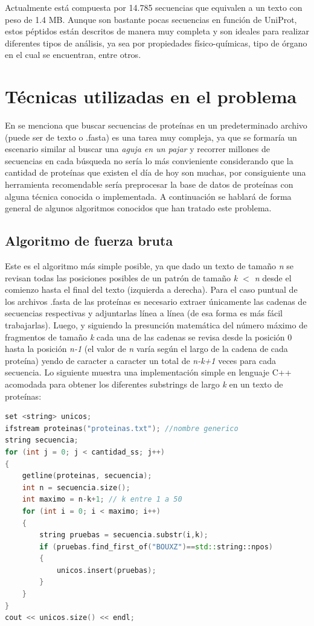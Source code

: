 Actualmente está compuesta por 14.785 secuencias que equivalen a un texto con peso de 1.4 MB. Aunque son bastante pocas secuencias en función de UniProt, estos péptidos están descritos de manera muy completa y son ideales para realizar diferentes tipos de análisis, ya sea por propiedades físico-químicas, tipo de órgano en el cual se encuentran, entre otros.

\section{Técnicas utilizadas en el problema}

En \cite{searching} se menciona que buscar secuencias de proteínas en un predeterminado archivo (puede ser de texto o .fasta) es una tarea muy compleja, ya que se formaría un escenario similar al buscar una {\textit{aguja en un pajar}} y recorrer millones de secuencias en cada búsqueda no sería lo más convieniente considerando que la cantidad de proteínas que existen el día de hoy son muchas, por consiguiente una herramienta recomendable sería preprocesar la base de datos de proteínas con alguna técnica conocida o implementada. A continuación se hablará de forma general de algunos algoritmos conocidos que han tratado este problema.

\subsection{Algoritmo de fuerza bruta}

Este es el algoritmo más simple posible\cite{fuerzabruta}, ya que dado un texto de tamaño \textit{n} se revisan todas las posiciones posibles de un patrón de tamaño \textit{k $<$ n} desde el comienzo hasta el final del texto (izquierda a derecha). Para el caso puntual de los archivos .fasta de las proteínas es necesario extraer únicamente las cadenas de secuencias respectivas y adjuntarlas línea a línea (de esa forma es más fácil trabajarlas). Luego, y siguiendo la presunción matemática del número máximo de fragmentos de tamaño \textit{k} cada una de las cadenas se revisa desde la posición 0 hasta la posición \textit{n-1} (el valor de \textit{n} varía según el largo de la cadena de cada proteína) yendo de caracter a caracter un total de \textit{n-k+1} veces para cada secuencia. Lo siguiente muestra una implementación simple en lenguaje C++ acomodada para obtener los diferentes substrings de largo \textit{k} en un texto de proteínas:
\\
\begin{lstlisting}[language=C++, caption=Búsqueda utilizando fuerza bruta en C++]
set <string> unicos;
ifstream proteinas("proteinas.txt"); //nombre generico
string secuencia;
for (int j = 0; j < cantidad_ss; j++)
{
    getline(proteinas, secuencia);
    int n = secuencia.size();
    int maximo = n-k+1; // k entre 1 a 50
    for (int i = 0; i < maximo; i++)
    {
        string pruebas = secuencia.substr(i,k);
        if (pruebas.find_first_of("BOUXZ")==std::string::npos)
        {
            unicos.insert(pruebas);
        }
    }
}
cout << unicos.size() << endl;
\end{lstlisting}

